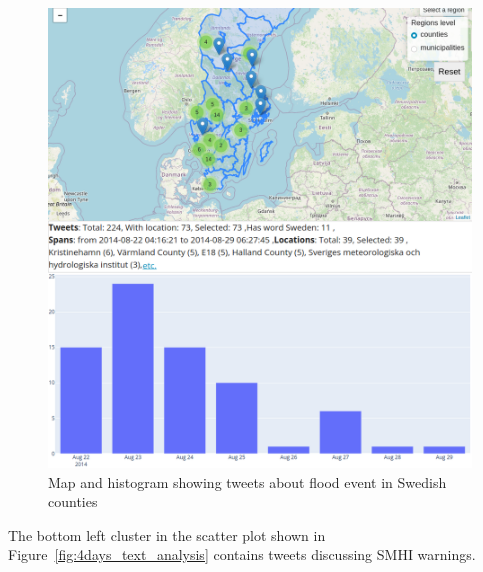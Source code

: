 \begin{figure}[H]
  \begin{center}
    \includegraphics[width=\columnwidth]{./images/4days_floods.png}
  \end{center}
  \caption{Map and histogram showing tweets about flood event in Swedish counties}
  \label{fig:4days_floods}
\end{figure}

The bottom left cluster in the scatter plot shown in Figure~\ref{fig:4days_text_analysis} contains tweets discussing \ac{SMHI}
warnings.

